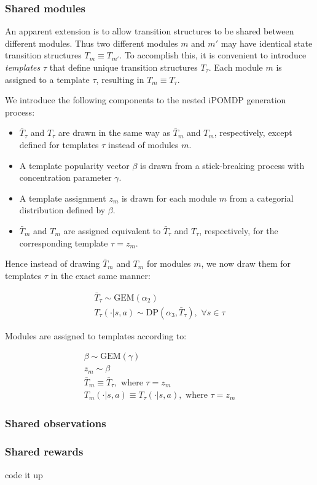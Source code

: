 \documentclass[11pt]{article}
\begin{document}
\subsubsection{Shared modules}

An apparent extension is to allow transition structures to be shared between different modules. Thus two different modules $m$ and $m'$ may have identical state transition structures $T_m \equiv T_{m'}$. To accomplish this, it is convenient to introduce \textit{templates} $\tau$ that define unique transition structures $T_{\tau}$. Each module $m$ is assigned to a template $\tau$, resulting in $T_m \equiv T_\tau$. 

We introduce the following components to the nested iPOMDP generation process:

\begin{itemize}
\item $\bar{T}_\tau$ and $T_\tau$ are drawn in the same way as $\bar{T}_m$ and $T_m$, respectively, except defined for templates $\tau$ instead of modules $m$.
\item A template popularity vector $\beta$ is drawn from a stick-breaking process with concentration parameter $\gamma$.
\item A template assignment $z_m$ is drawn for each module $m$ from a categorial distribution defined by $\beta$.
\item $\bar{T}_m$ and $T_m$ are assigned equivalent to $\bar{T}_\tau$ and $T_\tau$, respectively, for the corresponding template $\tau = z_m$.
\end{itemize}

Hence instead of drawing $\bar{T}_m$ and $T_m$ for modules $m$, we now draw them for templates $\tau$ in the exact same manner:

\begin{align*}
\bar{T}_{\tau} \sim \text{GEM}(\alpha_2)  \\
T_\tau(\cdot|s,a) \sim \text{DP}(\alpha_3, \bar{T}_\tau) ,\,\,\forall s \in \tau
\end{align*}

Modules are assigned to templates according to:

\begin{align*}
\beta \sim \text{GEM}(\gamma) \\
z_m \sim \beta \\
\bar{T}_{m} \equiv \bar{T}_{\tau},  \text{ where } \tau = z_m \\
T_m(\cdot|s,a) \equiv T_\tau(\cdot | s,a), \text{ where } \tau = z_m 
\end{align*}





\subsubsection{Shared observations}

\subsubsection{Shared rewards}


code it up




\renewcommand{\refname}{Bibliography \& References Cited}

\end{document}
